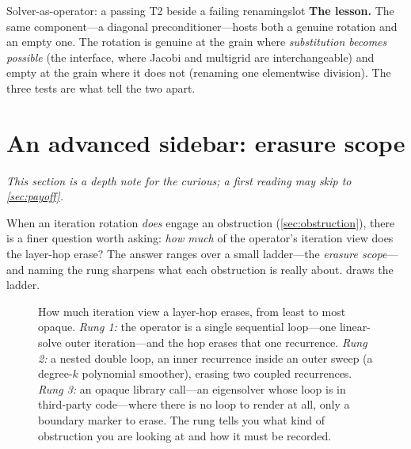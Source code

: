 \begin{workedexample}{Solver-as-operator: a passing T2 beside a failing renaming}{slot}
\textbf{The lesson.} The same component---a diagonal preconditioner---hosts both a
genuine rotation and an empty one. The rotation is genuine at the grain where
\emph{substitution becomes possible} (the  interface, where Jacobi and
multigrid are interchangeable) and empty at the grain where it does not (renaming
one elementwise division). The three tests are what tell the two apart.
\end{workedexample}

\section{An advanced sidebar: erasure scope}
\label{sec:erasure}

\emph{This section is a depth note for the curious; a first reading may skip to
\cref{sec:payoff}.}

When an iteration rotation \emph{does} engage an obstruction
(\cref{sec:obstruction}), there is a finer question worth asking: \emph{how much}
of the operator's iteration view does the layer-hop erase? The answer ranges over
a small ladder---the \emph{erasure scope}---and naming the rung sharpens what each
obstruction is really about.  draws the ladder.

\begin{figure}[t]
\centering
{}
\caption[The erasure-scope ladder]{How much iteration view a layer-hop erases,
from least to most opaque. \emph{Rung 1:} the operator is a single sequential
loop---one linear-solve outer iteration---and the hop erases that one recurrence.
\emph{Rung 2:} a nested double loop, an inner recurrence inside an outer sweep (a
degree-$k$ polynomial smoother), erasing two coupled recurrences. \emph{Rung 3:}
an opaque library call---an eigensolver whose loop is in third-party code---where
there is no loop to render at all, only a boundary marker to erase. The rung tells
you what kind of obstruction you are looking at and how it must be recorded.}
\label{fig:erasure}
\end{figure}

